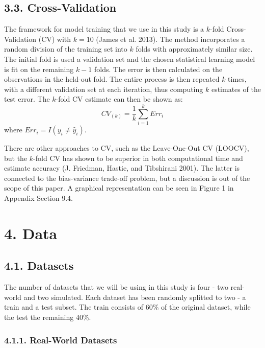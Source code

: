 \documentclass[12pt,]{article}
\begin{document}
\hypertarget{cross-validation}{%
\subsection{3.3. Cross-Validation}\label{cross-validation}}

The framework for model training that we use in this study is a
\(k\)-fold Cross-Validation (CV) with \(k=10\) (James et al. 2013). The
method incorporates a random division of the training set into \(k\)
folds with approximately similar size. The initial fold is used a
validation set and the chosen statistical learning model is fit on the
remaining \(k-1\) folds. The error is then calculated on the
observations in the held-out fold. The entire process is then repeated
\(k\) times, with a different validation set at each iteration, thus
computing \(k\) estimates of the test error. The \(k\)-fold CV estimate
can then be shown as: \[CV_{(k)}=\frac{1}{k}\sum_{i=1}^{k}Err_i\] where
\(Err_i = I(y_i\neq \widehat{y}_i)\).

There are other approaches to CV, such as the Leave-One-Out CV (LOOCV),
but the \(k\)-fold CV has shown to be superior in both computational
time and estimate accuracy (J. Friedman, Hastie, and Tibshirani 2001).
The latter is connected to the bias-variance trade-off problem, but a
discussion is out of the scope of this paper. A graphical representation
can be seen in Figure 1 in Appendix Section 9.4.

\hypertarget{data}{%
\section{4. Data}\label{data}}

\hypertarget{datasets}{%
\subsection{4.1. Datasets}\label{datasets}}

The number of datasets that we will be using in this study is four - two
real-world and two simulated. Each dataset has been randomly splitted to
two - a train and a test subset. The train consists of 60\% of the
original dataset, while the test the remaining 40\%.

\hypertarget{real-world-datasets}{%
\subsubsection{4.1.1. Real-World Datasets}\label{real-world-datasets}}
\end{document}

